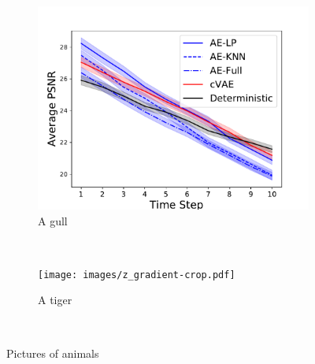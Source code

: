 \documentclass{article}
\begin{document}
\begin{figure}
  \centering
  \begin{subfigure}[b]{0.45\textwidth}
    \includegraphics[width=\textwidth]{images/best_of_k_i80.pdf}
    \caption{A gull}
    \label{fig:gull}
  \end{subfigure}
  ~ %
  \begin{subfigure}[b]{0.45\textwidth}
    \texttt{[image: images/z\_gradient-crop.pdf]}
    \caption{A tiger}
    \label{fig:tiger}
  \end{subfigure}
  ~ %
  \caption{Pictures of animals}\label{fig:animals}
  \end{figure}
\end{document}
